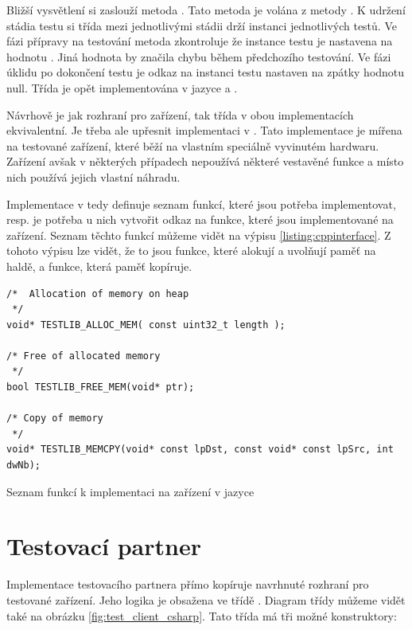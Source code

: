 Bližší vysvětlení si zaslouží metoda . Tato metoda je volána z metody . K udržení stádia testu si třída mezi jednotlivými stádii drží instanci jednotlivých testů. Ve fázi přípravy na testování metoda zkontroluje že instance testu je nastavena na hodnotu . Jiná hodnota by značila chybu během předchozího testování. Ve fázi úklidu po dokončení testu je odkaz na instanci testu nastaven na zpátky hodnotu null. Třída  je opět implementována v jazyce \csharp{} a \cpp{}.

Návrhově je jak rozhraní pro zařízení, tak třída  v obou implementacích ekvivalentní. Je třeba ale upřesnit implementaci v \cpp{}. Tato implementace je mířena na testované zařízení, které běží na vlastním speciálně vyvinutém hardwaru. Zařízení avšak v některých případech nepoužívá některé vestavěné funkce a místo nich používá jejich vlastní náhradu. 

Implementace v \cpp{} tedy definuje seznam funkcí, které jsou potřeba implementovat, resp. je potřeba u nich vytvořit odkaz na funkce, které jsou implementované na zařízení. Seznam těchto funkcí můžeme vidět na výpisu \ref{listing:cppinterface}. Z tohoto výpisu lze vidět, že to jsou funkce, které alokují a uvolňují paměť na haldě, a funkce, která paměť kopíruje. 

\begin{listing}[H]
    \centering
    \begin{verbatim}
/*  Allocation of memory on heap 
 */
void* TESTLIB_ALLOC_MEM( const uint32_t length );

/* Free of allocated memory 
 */
bool TESTLIB_FREE_MEM(void* ptr);

/* Copy of memory 
 */
void* TESTLIB_MEMCPY(void* const lpDst, const void* const lpSrc, int dwNb);
    \end{verbatim}
    \caption{Seznam funkcí k implementaci na zařízení v jazyce \protect\cpp{}}
    \label{listing:cppinterface}
\end{listing}


\section{Testovací partner}
Implementace testovacího partnera přímo kopíruje navrhnuté rozhraní pro testované zařízení. Jeho logika je obsažena ve třídě . Diagram třídy můžeme vidět také na obrázku \ref{fig:test_client_csharp}. Tato třída má tři možné konstruktory:

